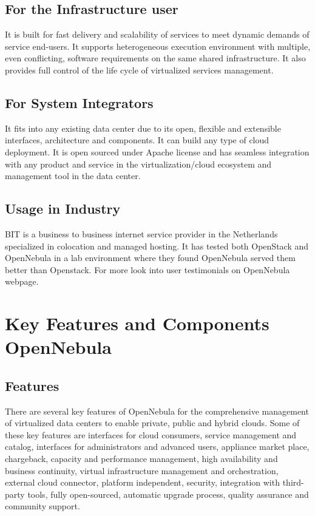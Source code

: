\documentclass[9pt,twocolumn,twoside]{../../styles/osajnl}
\begin{document}
\subsection{For the Infrastructure user}

It is built for fast delivery and scalability of services to meet 
dynamic demands of service end-users. It supports heterogeneous 
execution environment with multiple, even conflicting, software 
requirements on the same shared infrastructure. It also provides full 
control of the life cycle of virtualized services management.

\subsection{For System Integrators}

It fits into any existing data center due to its open, flexible and 
extensible interfaces, architecture and components. It can build any 
type of cloud deployment. It is open sourced under Apache license and 
has seamless integration with any product and service in the 
virtualization/cloud ecosystem and management tool in the data 
center.

\subsection{Usage in Industry}
{BIT is a business to business internet service provider in the Netherlands 
specialized in colocation and managed hosting. It has tested both OpenStack and
OpenNebula in a lab environment where they found OpenNebula served them 
better than Openstack}\cite{www-opennebula-bit}. {For more look into user testimonials on 
OpenNebula webpage}\cite{www-opennebula-usertests}.

\section{Key Features and Components OpenNebula}

\subsection{Features}
There are several key {features of 
OpenNebula}\cite{www-features-opennebula} for the comprehensive 
management of virtualized data centers to enable private, public and 
hybrid clouds. Some of these key features are interfaces for cloud 
consumers, service management and catalog, interfaces for 
administrators and advanced users, appliance market place, 
chargeback, capacity and performance management, high availability 
and business continuity, virtual infrastructure management and 
orchestration, external cloud connector, platform independent, 
security, integration with third-party tools, fully open-sourced, 
automatic upgrade process, quality assurance and community support.
\end{document}
